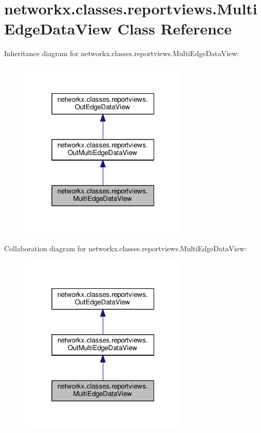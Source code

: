 \hypertarget{classnetworkx_1_1classes_1_1reportviews_1_1MultiEdgeDataView}{}\section{networkx.\+classes.\+reportviews.\+Multi\+Edge\+Data\+View Class Reference}
\label{classnetworkx_1_1classes_1_1reportviews_1_1MultiEdgeDataView}


Inheritance diagram for networkx.\+classes.\+reportviews.\+Multi\+Edge\+Data\+View\+:
\nopagebreak
\begin{figure}[H]
\begin{center}
\leavevmode
\includegraphics[width=229pt]{classnetworkx_1_1classes_1_1reportviews_1_1MultiEdgeDataView__inherit__graph}
\end{center}
\end{figure}


Collaboration diagram for networkx.\+classes.\+reportviews.\+Multi\+Edge\+Data\+View\+:
\nopagebreak
\begin{figure}[H]
\begin{center}
\leavevmode
\includegraphics[width=229pt]{classnetworkx_1_1classes_1_1reportviews_1_1MultiEdgeDataView__coll__graph}
\end{center}
\end{figure}
